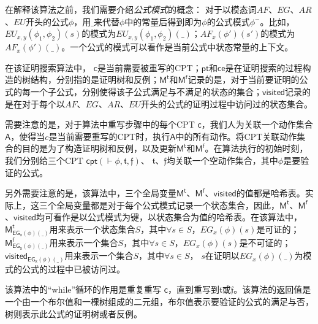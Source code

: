 在解释该算法之前，我们需要介绍\textit{公式模式}的概念：
对于以模态词$AF$、$EG$、$AR$、$EU$开头的公式$\phi$，用$\_$来代替$\phi$中的常量后得到即为$\phi$的公式模式$\phi^-$。比如，$EU_{x,y}(\phi_1,\phi_2)(s)$的模式为$EU_{x,y}(\phi_1,\phi_2)(\_)$；$AF_x(\phi')(s')$的模式为$AF_x(\phi')(\_)$。一个公式的模式可以看作是当前公式中状态常量的上下文。


在该证明搜索算法中，
$\mathsf{c}$是当前需要被重写的\textsf{CPT}；$\mathsf{pt}$和$\mathsf{ce}$是在证明搜索的过程构造的树结构，分别指的是证明树和反例；$\mathsf{M^t}$和$\mathsf{M^f}$记录的是，对于当前要证明的公式的每一个子公式，分别使得该子公式满足与不满足的状态的集合；$\mathsf{visited}$记录的是在对于每个以$AF$、$EG$、$AR$、$EU$开头的公式的证明过程中访问过的状态集合。

需要注意的是，对于算法中重写步骤中的每个\textsf{CPT} $\mathsf{c}$，我们人为关联一个动作集合$\mathsf{A}$，使得当$c$是当前需要重写的\textsf{CPT}时，执行$\mathsf{A}$中的所有动作。将\textsf{CPT}关联动作集合的目的是为了构造证明树和反例，以及更新$\mathsf{M^t}$和$\mathsf{M^f}$。在算法执行的初始时刻，我们分别给三个\textsf{CPT} $\textsf{cpt}(\vdash\phi,\mathfrak{t},\mathfrak{f})$、 $\mathfrak{t}$、$\mathfrak{f}$均关联一个空动作集合，其中$\phi$是要验证的公式。


另外需要注意的是，该算法中，三个全局变量$\mathsf{M^t}$、$\mathsf{M^f}$、$\mathsf{visited}$的值都是哈希表。实际上，这三个全局变量都是对于每个公式模式记录一个状态集合，因此，$\mathsf{M^t}$、$\mathsf{M^f}$、$\mathsf{visited}$均可看作是以公式模式为键，以状态集合为值的哈希表。在该算法中，$\mathsf{M^t_{EG_{x}(\phi)(\_)}}$用来表示一个状态集合$S$，其中$\forall s\in S$，$EG_{x}(\phi)(s)$是可证的；$\mathsf{M^f_{EG_{x}(\phi)(\_)}}$用来表示一个集合$S$，其中$\forall s\in S$，$EG_{x}(\phi)(s)$是不可证的；$\mathsf{visited_{EG_x(\phi)(\_)}}$用来表示一个集合$S$，其中$\forall s\in S$， $s$在证明以$EG_x(\phi)(\_)$为模式的公式的过程中已被访问过。


该算法中的“while”循环的作用是重复重写\CPT{} $\mathsf{c}$，直到重写到$\mathfrak{t}$或$\mathfrak{f}$。该算法的返回值是一个由一个布尔值和一棵树组成的二元组，布尔值表示要验证的公式的满足与否，树则表示此公式的证明树或者反例。


